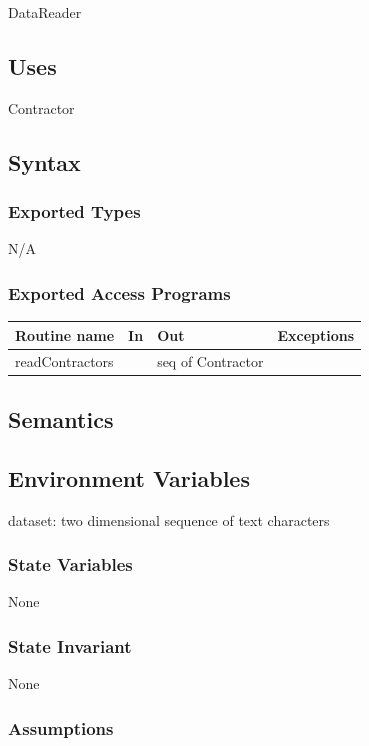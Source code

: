 \documentclass[12pt]{scrartcl}
\begin{document}
DataReader

\subsection {Uses}

Contractor


\subsection {Syntax}

\subsubsection {Exported Types}

N/A

\subsubsection {Exported Access Programs}

\begin{tabular}{| l | l | l | l |}
\hline
\textbf{Routine name} & \textbf{In} & \textbf{Out} & \textbf{Exceptions}\\
\hline
readContractors & & seq of Contractor  & \\
\hline
\end{tabular}

\subsection {Semantics}


\subsection {Environment Variables}

dataset: two dimensional sequence of text characters

\subsubsection {State Variables}

None

\subsubsection {State Invariant}

None

\subsubsection {Assumptions}
\end{document}
